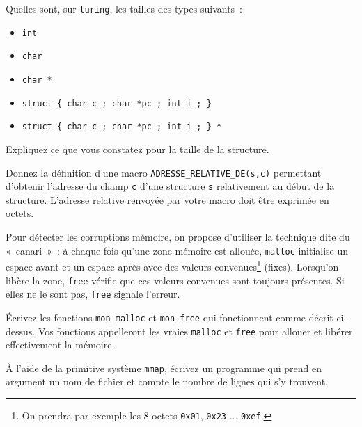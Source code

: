 %



\question

Quelles sont, sur \texttt {turing}, les tailles des types suivants~:
\begin {itemize}
    \item \texttt {int}
    \item \texttt {char}
    \item \texttt {char *}
    \item \verb|struct { char c ; char *pc ; int i ; }|
    \item \verb|struct { char c ; char *pc ; int i ; } *|
\end {itemize}

Expliquez ce que vous constatez pour la taille de la structure.


\question

Donnez la définition d'une macro \verb|ADRESSE_RELATIVE_DE(s,c)|
permettant d'obtenir l'adresse du champ \texttt {c} d'une structure
\texttt {s} relativement au début de la structure. L'adresse relative
renvoyée par votre macro doit être exprimée en octets.


\question

Pour détecter les corruptions mémoire, on propose d'utiliser la
technique dite du «~canari~»~: à chaque fois qu'une zone mémoire est
allouée, \texttt {malloc} initialise un espace avant et un espace après
avec des valeurs convenues\footnote {On prendra par exemple les 8 octets
\texttt {0x01}, \texttt {0x23} ... \texttt {0xef}.}
(fixes).  Lorsqu'on libère la zone, \texttt {free} vérifie que ces
valeurs convenues sont toujours présentes. Si elles ne le sont pas,
\texttt {free} signale l'erreur.

Écrivez les fonctions \texttt {mon\_malloc} et \texttt {mon\_free}
qui fonctionnent comme décrit ci-dessus. Vos fonctions appelleront
les vraies \texttt {malloc} et \texttt {free} pour allouer et libérer
effectivement la mémoire.


\question

À l'aide de la primitive système \texttt {mmap}, écrivez un programme
qui prend en argument un nom de fichier et compte le nombre de lignes
qui s'y trouvent.

